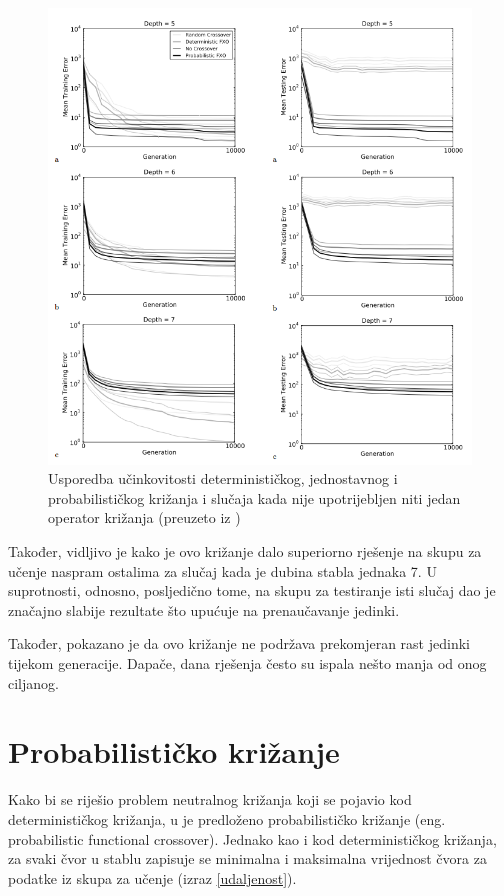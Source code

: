\begin{figure}[H]
	\centering
	\includegraphics[scale=0.65]{./slike/deto.png}
	\caption{Usporedba učinkovitosti determinističkog, jednostavnog i probabilističkog križanja i slučaja kada nije upotrijebljen niti jedan operator križanja (preuzeto iz \cite{crxDeter})}
	\label{deto}
\end{figure}

Također, vidljivo je kako je ovo križanje dalo superiorno rješenje na skupu za učenje naspram ostalima za slučaj kada je dubina stabla jednaka 7. U suprotnosti, odnosno, posljedično tome, na skupu za testiranje isti slučaj dao je značajno slabije rezultate što upućuje na prenaučavanje jedinki.

Također, pokazano je da ovo križanje ne podržava prekomjeran rast jedinki tijekom generacije. Dapače, dana rješenja često su ispala nešto manja od onog ciljanog.




\section{Probabilističko križanje}

Kako bi se riješio problem neutralnog križanja koji se pojavio kod determinističkog križanja, u \cite{crxDeter} je predloženo probabilističko križanje (eng. probabilistic functional crossover). Jednako kao i kod determinističkog križanja, za svaki čvor u stablu zapisuje se minimalna i maksimalna vrijednost čvora za podatke iz skupa za učenje (izraz \ref{udaljenost}).

